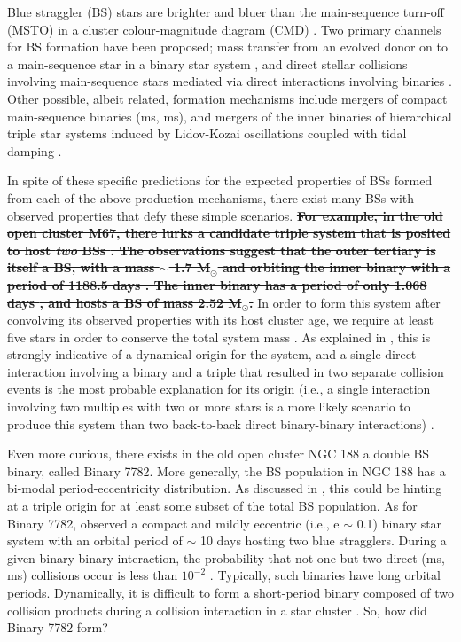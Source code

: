 \documentclass{aastex62}
\def\del#1{{\bf {\sout{#1}}}}
\begin{document}
Blue straggler (BS) stars are brighter and bluer than the
main-sequence turn-off (MSTO) in a cluster colour-magnitude diagram
(CMD) \citep[e.g.][]{1953AJ.....58...61S,simunovic14,simunovic16}.
Two primary channels for BS formation have been proposed; mass
transfer from an evolved donor on to a main-sequence star in a binary
star system
\citep[e.g.][]{mccrea64,997A&A...328..143P,knigge09,mathieu09,leigh11,geller11,geller12,gosnell14,gosnell15},
and direct stellar collisions involving main-sequence stars mediated
via direct interactions involving binaries
\citep[e.g.][]{hills75,1997A&A...328..130P,shara97,leigh07,leigh11,leigh13,hypki13,2018arXiv181100058P}.
Other possible, albeit related, formation mechanisms include mergers
of compact main-sequence binaries (ms, ms), and mergers of the inner
binaries of hierarchical triple star systems induced by Lidov-Kozai
oscillations coupled with tidal damping \citep[e.g.][]{perets09}.

In spite of these specific predictions for the expected properties of
BSs formed from each of the above production mechanisms, there exist
many BSs with observed properties that defy these simple scenarios.
\del{For example, in the old open cluster M67, there lurks a candidate
  triple system that is posited to host \textit{two} BSs
  \citep{vandenberg01,sandquist03}.  The observations suggest that the
  outer tertiary is itself a BS, with a mass $\sim$ 1.7 M$_{\odot}$
  and orbiting the inner binary with a period of 1188.5 days
  \citep{sandquist03}.  The inner binary has a period of only 1.068
  days \citep{vandenberg01}, and hosts a BS of mass 2.52 M$_{\odot}$.}
In order to form this system after convolving its observed properties
with its host cluster age, we require at least five stars in order to
conserve the total system mass \citep{leigh11}.  As explained in
\citet{leigh11}, this is strongly indicative of a dynamical origin for
the system, and a single direct interaction involving a binary and a
triple that resulted in two separate collision events is the most
probable explanation for its origin (i.e., a single interaction
involving two multiples with two or more stars is a more likely
scenario to produce this system than two back-to-back direct
binary-binary interactions) \citep{2004MNRAS.350..615G}.

Even more curious, there exists in the old open cluster NGC 188 a
double BS binary, called Binary 7782.  More generally, the BS population in NGC 188 has a bi-modal period-eccentricity distribution.  As discussed in \citet{leigh11}, this could be hinting at a triple origin for at least some subset of the total BS population.  As for Binary 7782, \citet{mathieu09}
observed a compact and mildly eccentric (i.e., e $\sim$ 0.1) binary
star system with an orbital period of $\sim$ 10 days hosting two blue
stragglers.  During a given binary-binary interaction, the probability
that not one but two direct (ms, ms) collisions occur is less than
$10^{-2}$ \citep{leonard89,leigh11,leigh12}.  Typically, such binaries
have long orbital periods. Dynamically, it is difficult to form a
short-period binary composed of two collision products during a
collision interaction in a star cluster \citep{2011Sci...334.1380F}.
So, how did Binary 7782 form?  
\end{document}
